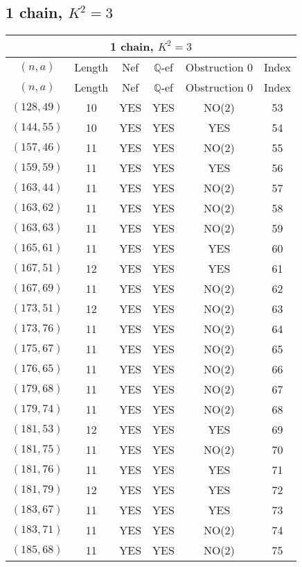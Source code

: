 \subsection{1 chain, $K^2 = 3$}
\begin{longtable}{|c|c|c|c|c|c|}
\hline
\multicolumn{6}{|c|}{1 chain, $K^2 = 3$}\\
\hline
$(n,a)$ & Length & Nef & $\mathbb Q$-ef & Obstruction 0 & Index\\
\hline
\endfirsthead

\hline
$(n,a)$ & Length & Nef & $\mathbb Q$-ef & Obstruction 0 & Index\\
\hline
\endhead
\hline
\endfoot

$(128, 49)$ & 10 & YES & YES & NO(2) & 53\\
$(144, 55)$ & 10 & YES & YES & YES & 54\\
$(157, 46)$ & 11 & YES & YES & NO(2) & 55\\
$(159, 59)$ & 11 & YES & YES & YES & 56\\
$(163, 44)$ & 11 & YES & YES & NO(2) & 57\\
$(163, 62)$ & 11 & YES & YES & NO(2) & 58\\
$(163, 63)$ & 11 & YES & YES & NO(2) & 59\\
$(165, 61)$ & 11 & YES & YES & YES & 60\\
$(167, 51)$ & 12 & YES & YES & YES & 61\\
$(167, 69)$ & 11 & YES & YES & NO(2) & 62\\
$(173, 51)$ & 12 & YES & YES & NO(2) & 63\\
$(173, 76)$ & 11 & YES & YES & NO(2) & 64\\
$(175, 67)$ & 11 & YES & YES & NO(2) & 65\\
$(176, 65)$ & 11 & YES & YES & NO(2) & 66\\
$(179, 68)$ & 11 & YES & YES & NO(2) & 67\\
$(179, 74)$ & 11 & YES & YES & NO(2) & 68\\
$(181, 53)$ & 12 & YES & YES & YES & 69\\
$(181, 75)$ & 11 & YES & YES & NO(2) & 70\\
$(181, 76)$ & 11 & YES & YES & YES & 71\\
$(181, 79)$ & 12 & YES & YES & YES & 72\\
$(183, 67)$ & 11 & YES & YES & YES & 73\\
$(183, 71)$ & 11 & YES & YES & NO(2) & 74\\
$(185, 68)$ & 11 & YES & YES & NO(2) & 75\\

\end{longtable}
